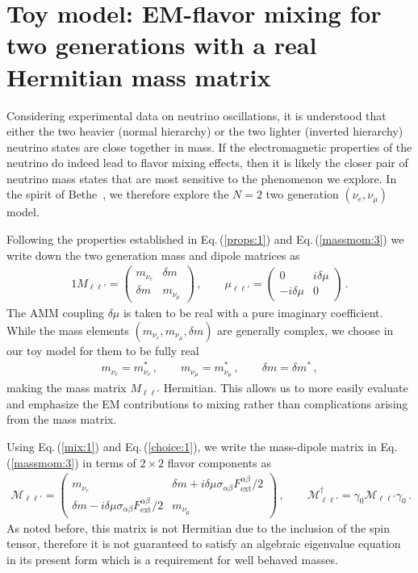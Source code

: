 \documentclass{ws-ijmpa}
\newcommand{\req}[1]{Eq.\,(\ref{#1})}
\begin{document}
\section{Toy model: EM-flavor mixing for two generations with a real Hermitian mass matrix}
\label{sec:toy}
Considering experimental data on neutrino oscillations, it is understood that either the two heavier (normal hierarchy) or the two lighter (inverted hierarchy) neutrino states are close together in mass. If the electromagnetic properties of the neutrino do indeed lead to flavor mixing effects, then it is likely the closer pair of neutrino mass states that are most sensitive to the phenomenon we explore. In the spirit of Bethe~\cite{Bethe:1986ej}, we therefore explore the $N=2$ two generation $(\nu_{e},\nu_{\mu})$ model.

Following the properties established in \req{props:1} and \req{massmom:3} we write down the two generation mass and dipole matrices as
\begin{alignat}{1}
\label{mix:1} M_{\ell\ell'}= 
\begin{pmatrix}
m_{\nu_{e}} & {\delta m}\\
{\delta m} & m_{\nu_{\mu}}
\end{pmatrix}\,,\qquad
\mu_{\ell\ell'} = 
\begin{pmatrix}
0 & i\delta\mu\\
-i\delta\mu & 0
\end{pmatrix}\,.
\end{alignat}
The AMM coupling $\delta\mu$ is taken to be real with a pure imaginary coefficient. While the mass elements $(m_{\nu_{e}},m_{\nu_{\mu}},{\delta m})$ are generally complex, we choose in our toy model for them to be fully real
\begin{align}
\label{choice:1}
m_{\nu_{e}}=m_{\nu_{e}}^{*}\,,\qquad
m_{\nu_{\mu}}=m_{\nu_{\mu}}^{*}\,,\qquad
\delta m=\delta m^{*}\,,
\end{align}
making the mass matrix $M_{\ell\ell'}$ Hermitian. This allows us to more easily evaluate and emphasize the EM contributions to mixing rather than complications arising from the mass matrix.

Using \req{mix:1} and \req{choice:1}, we write the mass-dipole matrix in \req{massmom:3} in terms of $2\times2$ flavor components as
\begin{align}
\label{mix:2}
\mathcal{M}_{\ell\ell'} = 
\begin{pmatrix}
m_{\nu_{e}} & {\delta m}+i\delta\mu\sigma_{\alpha\beta}F^{\alpha\beta}_\mathrm{ext}/2\\
{\delta m}-i\delta\mu\sigma_{\alpha\beta}F^{\alpha\beta}_\mathrm{ext}/2 & m_{\nu_{\mu}}
\end{pmatrix}\,,\qquad
\mathcal{M}_{\ell\ell'}^{\dag}=\gamma_{0}\mathcal{M}_{\ell\ell'}\gamma_{0}\,.
\end{align}
As noted before, this matrix is not Hermitian due to the inclusion of the spin tensor, therefore it is not guaranteed to satisfy an algebraic eigenvalue equation in its present form which is a requirement for well behaved masses.
\end{document}
